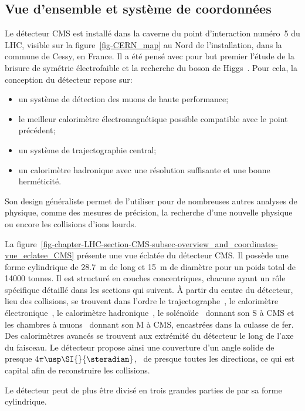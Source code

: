 \subsection{Vue d'ensemble et système de coordonnées}\label{chapter-LHC-section-CMS-subsec-overview_and_coordinates}
Le détecteur CMS est installé dans la caverne du point d'interaction numéro~5 du LHC, visible sur la figure~\ref{fig-CERN_map} au Nord de l'installation, dans la commune de Cessy, en France.
Il a été pensé avec pour but premier l'étude de la brisure de symétrie électrofaible et la recherche du boson de Higgs~\cite{cms_letter_intent}.
Pour cela, la conception du détecteur repose sur:
\begin{itemize}
\item un système de détection des muons de haute performance;
\item le meilleur calorimètre électromagnétique possible compatible avec le point précédent;
\item un système de trajectographie central;
\item un calorimètre hadronique avec une résolution suffisante et une bonne herméticité.
\end{itemize}
Son design généraliste permet de l'utiliser pour de nombreuses autres analyses de physique, comme des mesures de précision, la recherche d'une nouvelle physique ou encore les collisions d'ions lourds.
\par La figure~\ref{fig-chapter-LHC-section-CMS-subsec-overview_and_coordinates-vue_eclatee_CMS} présente une vue éclatée du détecteur CMS.
Il possède une forme cylindrique de \SI{28.7}{\meter} de long et \SI{15}{\meter} de diamètre pour un poids total de \num{14000} tonnes.
Il est structuré en couches concentriques, chacune ayant un rôle spécifique détaillé dans les sections qui suivent.
À partir du centre du détecteur, lieu des collisions, se trouvent dans l'ordre
le trajectographe~\cite{CERN-LHCC-98-006},
le calorimètre électronique~\cite{CERN-LHCC-97-033},
le calorimètre hadronique~\cite{CERN-LHCC-97-031},
le solénoïde~\cite{CERN-LHCC-97-010} donnant son \og S \fg{} à CMS et
les chambres à muons~\cite{CERN-LHCC-97-032} donnant son \og M \fg{} à CMS, encastrées dans la culasse de fer.
Des calorimètres avancés se trouvent aux extrémité du détecteur le long de l'axe du faisceau.
Le détecteur propose ainsi une couverture d'un angle solide de presque $4\pi\usp\SI{}{\steradian}$, \ie\ de presque toutes les directions, ce qui est capital afin de reconstruire les collisions.
\par Le détecteur peut de plus être divisé en trois grandes parties de par sa forme cylindrique.
